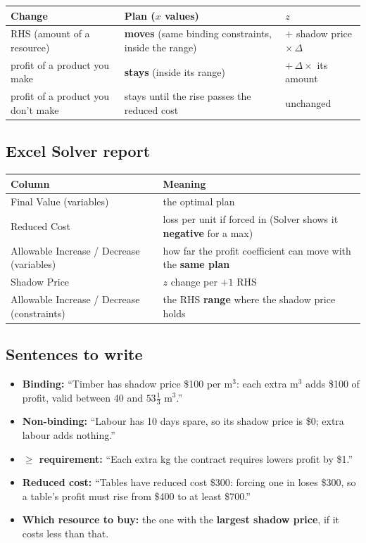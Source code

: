 \documentclass[10pt,a4paper]{article}
\newcommand{\thead}[1]{\textbf{#1}}
\newcommand{\Ge}{\ensuremath{\geq}}
\begin{document}
\begin{tabularx}{\linewidth}{@{}l L l@{}}
\toprule
\thead{Change} & \thead{Plan ($x$ values)} & \thead{$z$} \\
\midrule
RHS (amount of a resource) & \textbf{moves} (same binding constraints, inside the range) & $+$ shadow price $\times\,\Delta$ \\
profit of a product you make & \textbf{stays} (inside its range) & $+\,\Delta \times$ its amount \\
profit of a product you don't make & stays until the rise passes the reduced cost & unchanged \\
\bottomrule
\end{tabularx}

\subsection{Excel Solver report}

\begin{tabularx}{\linewidth}{@{}l L@{}}
\toprule
\thead{Column} & \thead{Meaning} \\
\midrule
Final Value (variables) & the optimal plan \\
Reduced Cost & loss per unit if forced in (Solver shows it \textbf{negative} for a max) \\
Allowable Increase / Decrease (variables) & how far the profit coefficient can move with the \textbf{same plan} \\
Shadow Price & $z$ change per $+1$ RHS \\
Allowable Increase / Decrease (constraints) & the RHS \textbf{range} where the shadow price holds \\
\bottomrule
\end{tabularx}

\subsection{Sentences to write}

\begin{itemize}
  \item \textbf{Binding:} ``Timber has shadow price \$100 per m$^3$: each extra m$^3$ adds \$100 of profit, valid between 40 and $53\frac13$ m$^3$.''
  \item \textbf{Non-binding:} ``Labour has 10 days spare, so its shadow price is \$0; extra labour adds nothing.''
  \item \textbf{\Ge{} requirement:} ``Each extra kg the contract requires lowers profit by \$1.''
  \item \textbf{Reduced cost:} ``Tables have reduced cost \$300: forcing one in loses \$300, so a table's profit must rise from \$400 to at least \$700.''
  \item \textbf{Which resource to buy:} the one with the \textbf{largest shadow price}, if it costs less than that.
\end{itemize}
\end{document}
